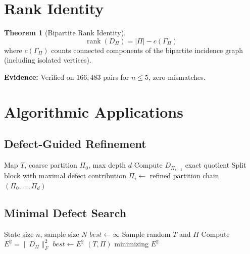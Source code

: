 \documentclass[11pt]{article}
\theoremstyle{definition}
\newtheorem{theorem}{Theorem}
\begin{document}
\section{Rank Identity}

\begin{theorem}[Bipartite Rank Identity]
\[
\operatorname{rank}(D_\Pi) = |\Pi| - c(\Gamma_\Pi)
\]
where $c(\Gamma_\Pi)$ counts connected components of the bipartite incidence graph (including isolated vertices).
\end{theorem}

\textbf{Evidence:} Verified on $166{,}483$ pairs for $n \leq 5$, zero mismatches.

\section{Algorithmic Applications}

\subsection{Defect-Guided Refinement}

\begin{algorithm}
\caption{Defect-Guided Refinement}
\begin{algorithmic}
\Require Map $T$, coarse partition $\Pi_0$, max depth $d$
    \State Compute $D_{\Pi_{i-1}}$
        \State \Return exact quotient
    \EndIf
    \State Split block with maximal defect contribution
    \State $\Pi_i \gets$ refined partition
\EndFor
\State \Return chain $(\Pi_0, \dots, \Pi_d)$
\end{algorithmic}
\end{algorithm}

\subsection{Minimal Defect Search}

\begin{algorithm}
\caption{Minimal Defect Search}
\begin{algorithmic}
\Require State size $n$, sample size $N$
\State $best \gets \infty$
    \State Sample random $T$ and $\Pi$
    \State Compute $E^2 = \|D_\Pi\|_F^2$
        \State $best \gets E^2$
    \EndIf
\EndFor
\State \Return $(T, \Pi)$ minimizing $E^2$
\end{algorithmic}
\end{algorithm}
\end{document}
